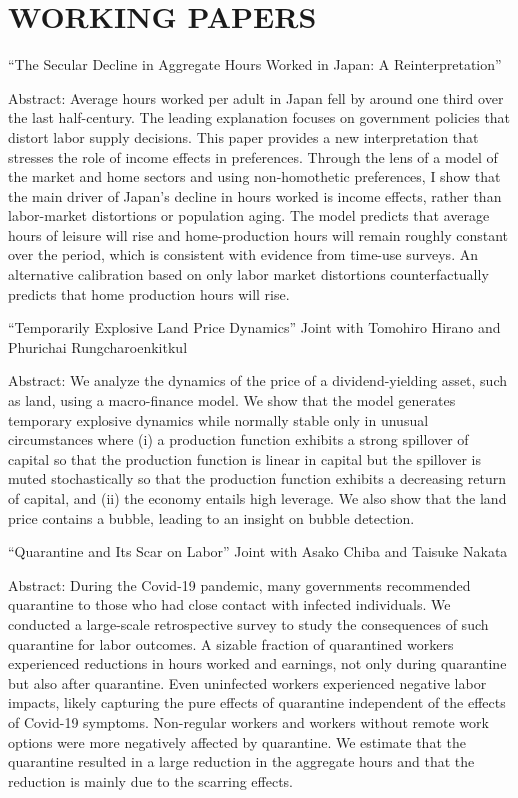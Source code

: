 \documentclass[12pt]{article}
\begin{document}
\section*{WORKING PAPERS}
``The Secular Decline in Aggregate Hours Worked in Japan: A Reinterpretation''
\begin{adjustwidth}{1em}{1em}
Abstract: Average hours worked per adult in Japan fell by around one third over the last half-century. The leading explanation focuses on government policies that distort labor supply decisions. This paper provides a new interpretation that stresses the role of income effects in preferences. Through the lens of a model of the market and home sectors and using non-homothetic preferences, I show that the main driver of Japan's decline in hours worked is income effects, rather than labor-market distortions or population aging. The model predicts that average hours of leisure will rise and home-production hours will remain roughly constant over the period, which is consistent with evidence from time-use surveys. An alternative calibration based on only labor market distortions counterfactually predicts that home production hours will rise.
\end{adjustwidth}
\vspace{1em}
``Temporarily Explosive Land Price Dynamics'' Joint with Tomohiro Hirano and Phurichai Rungcharoenkitkul
\begin{adjustwidth}{1em}{1em}
  Abstract: We analyze the dynamics of the price of a dividend-yielding asset, such as land, using a macro-finance model. We show that the model generates temporary explosive dynamics while normally stable only in unusual circumstances where (i) a production function exhibits a strong spillover of capital so that the production function is linear in capital but the spillover is muted stochastically so that the production function exhibits a decreasing return of capital, and (ii) the economy entails high leverage. We also show that the land price contains a bubble, leading to an insight on bubble detection.
\end{adjustwidth}
\vspace{1em}
``Quarantine and Its Scar on Labor'' Joint with Asako Chiba and Taisuke Nakata
\begin{adjustwidth}{1em}{1em}
Abstract: During the Covid-19 pandemic, many governments recommended quarantine to those who had close contact with infected individuals. We conducted a large-scale retrospective survey to study the consequences of such quarantine for labor outcomes. A sizable fraction of quarantined workers experienced reductions in hours worked and earnings, not only during quarantine but also after quarantine. Even uninfected workers experienced negative labor impacts, likely capturing the pure effects of quarantine independent of the effects of Covid-19 symptoms. Non-regular workers and workers without remote work options were more negatively affected by quarantine. We estimate that the quarantine resulted in a large reduction in the aggregate hours and that the reduction is mainly due to the scarring effects.
\end{adjustwidth}
\end{document}

